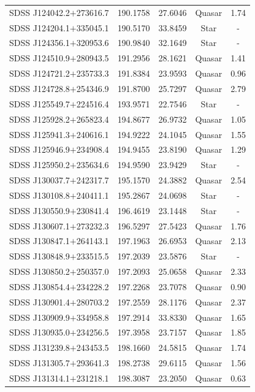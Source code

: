 \begin{longtable}{c c c c c}
SDSS J124042.2$+$273616.7 & 190.1758 & 27.6046 & Quasar & 1.74 \\
SDSS J124204.1$+$335045.1 & 190.5170 & 33.8459 & Star & - \\
SDSS J124356.1$+$320953.6 & 190.9840 & 32.1649 & Star & - \\
SDSS J124510.9$+$280943.5 & 191.2956 & 28.1621 & Quasar & 1.41 \\
SDSS J124721.2$+$235733.3 & 191.8384 & 23.9593 & Quasar & 0.96 \\
SDSS J124728.8$+$254346.9 & 191.8700 & 25.7297 & Quasar & 2.79 \\
SDSS J125549.7$+$224516.4 & 193.9571 & 22.7546 & Star & - \\
SDSS J125928.2$+$265823.4 & 194.8677 & 26.9732 & Quasar & 1.05 \\
SDSS J125941.3$+$240616.1 & 194.9222 & 24.1045 & Quasar & 1.55 \\
SDSS J125946.9$+$234908.4 & 194.9455 & 23.8190 & Quasar & 1.29 \\
SDSS J125950.2$+$235634.6 & 194.9590 & 23.9429 & Star & - \\
SDSS J130037.7$+$242317.7 & 195.1570 & 24.3882 & Quasar & 2.54 \\
SDSS J130108.8$+$240411.1 & 195.2867 & 24.0698 & Star & - \\
SDSS J130550.9$+$230841.4 & 196.4619 & 23.1448 & Star & - \\
SDSS J130607.1$+$273232.3 & 196.5297 & 27.5423 & Quasar & 1.76 \\
SDSS J130847.1$+$264143.1 & 197.1963 & 26.6953 & Quasar & 2.13 \\
SDSS J130848.9$+$233515.5 & 197.2039 & 23.5876 & Star & - \\
SDSS J130850.2$+$250357.0 & 197.2093 & 25.0658 & Quasar & 2.33 \\
SDSS J130854.4$+$234228.2 & 197.2268 & 23.7078 & Quasar & 0.90 \\
SDSS J130901.4$+$280703.2 & 197.2559 & 28.1176 & Quasar & 2.37 \\
SDSS J130909.9$+$334958.8 & 197.2914 & 33.8330 & Quasar & 1.65 \\
SDSS J130935.0$+$234256.5 & 197.3958 & 23.7157 & Quasar & 1.85 \\
SDSS J131239.8$+$243453.5 & 198.1660 & 24.5815 & Quasar & 1.74 \\
SDSS J131305.7$+$293641.3 & 198.2738 & 29.6115 & Quasar & 1.56 \\
SDSS J131314.1$+$231218.1 & 198.3087 & 23.2050 & Quasar & 0.63 \\

\end{longtable}
